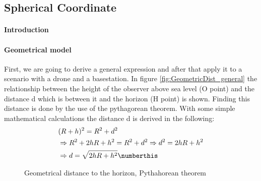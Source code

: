\subsection*{Spherical Coordinate}
\paragraph{Introduction}


\paragraph{Geometrical model}

First, we are going to derive a general expression and after that apply it to a scenario with a drone and a basestation. In figure  \ref{fig:GeometricDist_general} the relationship between the height of the observer above sea level (O point) and the distance d which is between it and the horizon (H point) is shown. Finding this distance is done by the use of the pythagorean theorem. With some simple mathematical calculations the distance d is derived in the following:
\begin{align*}
&(R+h)^2 = R^2+d^2\nonumber \\
&\Rightarrow R^2+2hR+h^2 = R^2+d^2 \Rightarrow d^2 = 2hR + h^2 \\
&\Rightarrow d = \sqrt{2hR + h^2}\numberthis \label{eq:los_distToHorizon}
\end{align*} 

\begin{figure}%
    \centering
    \qquad
    \caption{Geometrical distance to the horizon, Pythahorean theorem}%
    \label{fig:GeometricDistanceToHorizon}%
\end{figure}

